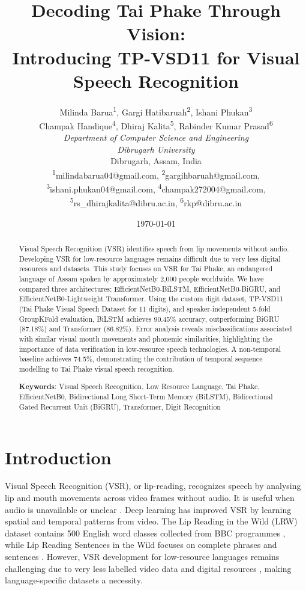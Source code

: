 \documentclass[journal]{IEEEtran}
\title{Decoding Tai Phake Through Vision:\\ Introducing TP-VSD11 for Visual Speech Recognition}
\author{
Milinda Barua\textsuperscript{1},
Gargi Hatibaruah\textsuperscript{2},
Ishani Phukan\textsuperscript{3}\\
Champak Handique\textsuperscript{4},
Dhiraj Kalita\textsuperscript{5},
Rabinder Kumar Prasad\textsuperscript{6}\\[0.3cm]
\textit{Department of Computer Science and Engineering}\\
\textit{Dibrugarh University}\\
Dibrugarh, Assam, India\\[0.2cm]
\textsuperscript{1}milindabarua04@gmail.com,
\textsuperscript{2}gargihbaruah@gmail.com,
\textsuperscript{3}ishani.phukan04@gmail.com,
\textsuperscript{4}champak272004@gmail.com,
\textsuperscript{5}rs\_dhirajkalita@dibru.ac.in,
\textsuperscript{6}rkp@dibru.ac.in
\vspace{-8pt}
}
\date{\today}
\begin{document}
\maketitle
\begin{abstract}
    Visual Speech Recognition (VSR) identifies speech from lip movements without audio. Developing VSR for low-resource languages remains difficult due to very less digital resources and datasets. This study focuses on VSR for Tai Phake, an endangered language of Assam spoken by approximately 2,000 people worldwide. We have compared three architectures: EfficientNetB0-BiLSTM, EfficientNetB0-BiGRU, and EfficientNetB0-Lightweight Transformer. Using the custom digit dataset, TP-VSD11 (Tai Phake Visual Speech Dataset for 11 digits), and speaker-independent 5-fold GroupKFold evaluation, BiLSTM achieves 90.45\% accuracy, outperforming BiGRU (87.18\%) and Transformer (86.82\%). Error analysis reveals misclassifications associated with similar visual mouth movements and phonemic similarities, highlighting the importance of data verification in low-resource speech technologies. A non-temporal baseline achieves 74.5\%, demonstrating the contribution of temporal sequence modelling to Tai Phake visual speech recognition.

    \textbf{Keywords}: Visual Speech Recognition, Low Resource Language, Tai Phake, EfficientNetB0, Bidirectional Long Short-Term Memory (BiLSTM), Bidirectional Gated Recurrent Unit (BiGRU), Transformer, Digit Recognition
\end{abstract}


\section{Introduction}
Visual Speech Recognition (VSR), or lip-reading, recognizes speech by analysing lip and mouth movements across video frames without audio. It is useful when audio is unavailable or unclear \cite{fernandezlopez2018survey}. Deep learning has improved VSR by learning spatial and temporal patterns from video. The Lip Reading in the Wild (LRW) dataset contains 500 English word classes collected from BBC programmes \cite{chung2016lipreading}, while Lip Reading Sentences in the Wild focuses on complete phrases and sentences \cite{chung2017sentences}. However, VSR development for low-resource languages remains challenging due to very less labelled video data and digital resources \cite{magueresse2020low}, making language-specific datasets a necessity.
\end{document}

